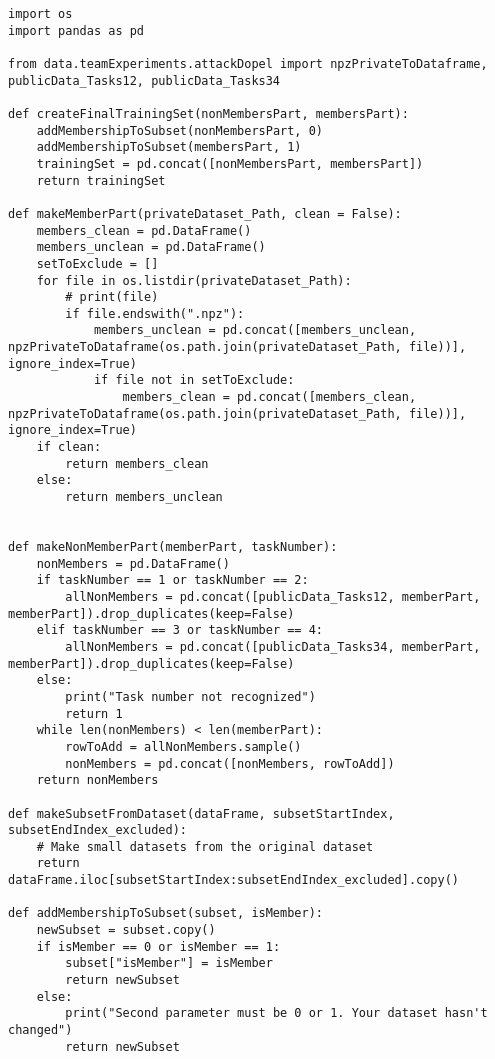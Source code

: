 \newpage\begin{lstlisting}[caption={Fonctions permettant de créer les données d'entraînement des
classifieurs}]
import os
import pandas as pd

from data.teamExperiments.attackDopel import npzPrivateToDataframe, publicData_Tasks12, publicData_Tasks34

def createFinalTrainingSet(nonMembersPart, membersPart):
    addMembershipToSubset(nonMembersPart, 0)
    addMembershipToSubset(membersPart, 1)
    trainingSet = pd.concat([nonMembersPart, membersPart])
    return trainingSet

def makeMemberPart(privateDataset_Path, clean = False):
    members_clean = pd.DataFrame()
    members_unclean = pd.DataFrame()
    setToExclude = []
    for file in os.listdir(privateDataset_Path):
        # print(file)
        if file.endswith(".npz"):
            members_unclean = pd.concat([members_unclean, npzPrivateToDataframe(os.path.join(privateDataset_Path, file))], ignore_index=True)
            if file not in setToExclude:
                members_clean = pd.concat([members_clean, npzPrivateToDataframe(os.path.join(privateDataset_Path, file))], ignore_index=True)
    if clean:
        return members_clean
    else:
        return members_unclean


def makeNonMemberPart(memberPart, taskNumber):
    nonMembers = pd.DataFrame()
    if taskNumber == 1 or taskNumber == 2:
        allNonMembers = pd.concat([publicData_Tasks12, memberPart, memberPart]).drop_duplicates(keep=False)
    elif taskNumber == 3 or taskNumber == 4:
        allNonMembers = pd.concat([publicData_Tasks34, memberPart, memberPart]).drop_duplicates(keep=False)
    else:
        print("Task number not recognized")
        return 1
    while len(nonMembers) < len(memberPart):
        rowToAdd = allNonMembers.sample()
        nonMembers = pd.concat([nonMembers, rowToAdd])
    return nonMembers

def makeSubsetFromDataset(dataFrame, subsetStartIndex, subsetEndIndex_excluded):
    # Make small datasets from the original dataset
    return dataFrame.iloc[subsetStartIndex:subsetEndIndex_excluded].copy()

def addMembershipToSubset(subset, isMember):
    newSubset = subset.copy()
    if isMember == 0 or isMember == 1:
        subset["isMember"] = isMember
        return newSubset
    else:
        print("Second parameter must be 0 or 1. Your dataset hasn't changed")
        return newSubset
\end{lstlisting}


